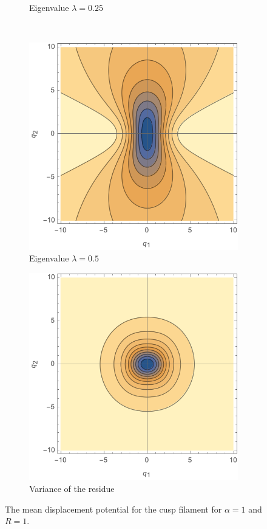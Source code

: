 \documentclass[a4paper, 11pt]{article}
\begin{document}
\begin{figure}
\begin{subfigure}[b]{0.45\textwidth}
\caption{Eigenvalue $\lambda=0.25$}
\end{subfigure}\\
\begin{subfigure}[b]{0.45\textwidth}
\includegraphics[width=\textwidth]{A3Mean_lambda=050}
\caption{Eigenvalue $\lambda=0.5$}
\end{subfigure}
\begin{subfigure}[b]{0.45\textwidth}
\includegraphics[width=\textwidth]{A3Variance}
\caption{Variance of the residue}
\end{subfigure}
\caption{The mean displacement potential for the cusp filament for $\alpha =1$ and $R=1$.}
\label{fig:A3Mean}
\end{figure}
\end{document}
